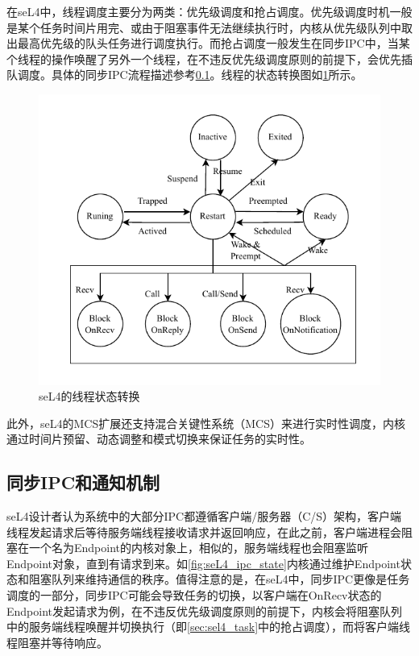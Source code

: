 在seL4中，线程调度主要分为两类：优先级调度和抢占调度。优先级调度时机一般是某个任务时间片用完、或由于阻塞事件无法继续执行时，内核从优先级队列中取出最高优先级的队头任务进行调度执行。而抢占调度一般发生在同步IPC中，当某个线程的操作唤醒了另外一个线程，在不违反优先级调度原则的前提下，会优先插队调度。具体的同步IPC流程描述参考\ref{sec:sel4_ipc}。线程的状态转换图如\ref{fig:seL4_thread_state}所示。

\begin{figure}[htbp]
  \centering
  \includegraphics{figures/seL4_thread_state.drawio.pdf}
  \caption{seL4的线程状态转换}\label{fig:seL4_thread_state}
\end{figure}

此外，seL4的MCS扩展还支持混合关键性系统（MCS）来进行实时性调度，内核通过时间片预留、动态调整和模式切换来保证任务的实时性。

\subsection{同步IPC和通知机制}
\label{sec:sel4_ipc}

seL4设计者认为系统中的大部分IPC都遵循客户端/服务器（C/S）架构，客户端线程发起请求后等待服务端线程接收请求并返回响应，在此之前，客户端进程会阻塞在一个名为Endpoint的内核对象上，相似的，服务端线程也会阻塞监听Endpoint对象，直到有请求到来。如\ref{fig:seL4_ipc_state}内核通过维护Endpoint状态和阻塞队列来维持通信的秩序。值得注意的是，在seL4中，同步IPC更像是任务调度的一部分，同步IPC可能会导致任务的切换，以客户端在OnRecv状态的Endpoint发起请求为例，在不违反优先级调度原则的前提下，内核会将阻塞队列中的服务端线程唤醒并切换执行（即\ref{sec:sel4_task}中的抢占调度），而将客户端线程阻塞并等待响应。

